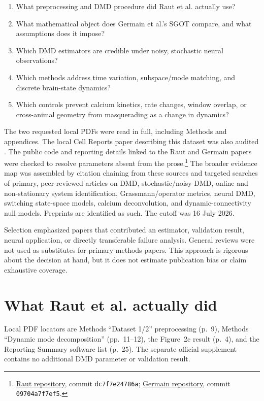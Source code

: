 \documentclass[11pt,a4paper]{article}
\begin{document}
\begin{enumerate}
  \item What preprocessing and DMD procedure did Raut et al. actually use?
  \item What mathematical object does Germain et al.'s SGOT compare, and what assumptions does it impose?
  \item Which DMD estimators are credible under noisy, stochastic neural observations?
  \item Which methods address time variation, subspace/mode matching, and discrete brain-state dynamics?
  \item Which controls prevent calcium kinetics, rate changes, window overlap, or cross-animal geometry from masquerading as a change in dynamics?
\end{enumerate}

The two requested local PDFs were read in full, including Methods and appendices. The local Cell Reports paper describing this dataset was also audited \citep{kiyooka2026}. The public code and reporting details linked to the Raut and Germain papers were checked to resolve parameters absent from the prose.\footnote{\href{https://github.com/ryraut/arousal_dynamics}{Raut repository}, commit \texttt{dc7f7e24786a}; \href{https://github.com/thibaut-germain/SGOT}{Germain repository}, commit \texttt{09704a7f7ef5}.} The broader evidence map was assembled by citation chaining from these sources and targeted searches of primary, peer-reviewed articles on DMD, stochastic/noisy DMD, online and non-stationary system identification, Grassmann/operator metrics, neural DMD, switching state-space models, calcium deconvolution, and dynamic-connectivity null models. Preprints are identified as such. The cutoff was 16 July 2026.

Selection emphasized papers that contributed an estimator, validation result, neural application, or directly transferable failure analysis. General reviews were not used as substitutes for primary methods papers. This approach is rigorous about the decision at hand, but it does not estimate publication bias or claim exhaustive coverage.

\section{What Raut et al. actually did}

Local PDF locators are Methods ``Dataset 1/2'' preprocessing (p.~9), Methods ``Dynamic mode decomposition'' (pp.~11--12), the Figure~2c result (p.~4), and the Reporting Summary software list (p.~25). The separate official supplement contains no additional DMD parameter or validation result.
\end{document}
